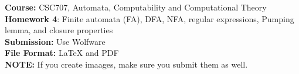 \documentclass{article}%
\begin{document}
\begin{flushleft}
\textbf{Course:} CSC707, Automata, Computability and Computational Theory\\
\textbf{Homework 4}: Finite automata (FA), DFA, NFA, regular expressions, Pumping lemma, and closure properties\\
\textbf{Submission:} Use Wolfware\\
\textbf{File Format:} LaTeX and PDF\\
\textbf{NOTE:} If you create imaages, make sure you submit them as well.
\end{flushleft}

\begin{center}
\\
\end{center}

\noindent{\hrulefill}

\bigskip
\end{document}
